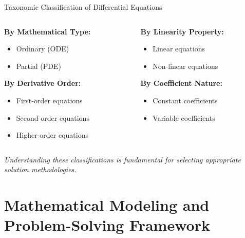 \documentclass[10pt,aspectratio=169]{beamer}
\newcommand{\concept}[1]{\textbf{#1}}
\newcommand{\emphasis}[1]{\textit{#1}}
\begin{document}
\begin{frame}{Taxonomic Classification of Differential Equations}
    \begin{columns}
        \begin{column}{0.5\textwidth}
            \concept{By Mathematical Type:}
            \begin{itemize}
                \item Ordinary (ODE)
                \item Partial (PDE)
            \end{itemize}
            
            
            \concept{By Derivative Order:}
            \begin{itemize}
                \item First-order equations
                \item Second-order equations
                \item Higher-order equations
            \end{itemize}
        \end{column}
        \begin{column}{0.5\textwidth}
            \concept{By Linearity Property:}
            \begin{itemize}
                \item Linear equations
                \item Non-linear equations
            \end{itemize}
            
            
            \concept{By Coefficient Nature:}
            \begin{itemize}
                \item Constant coefficients
                \item Variable coefficients
            \end{itemize}
        \end{column}
    \end{columns}
    
    
    \emphasis{Understanding these classifications is fundamental for selecting appropriate solution methodologies.}
\end{frame}

\section{Mathematical Modeling and Problem-Solving Framework}
\end{document}
